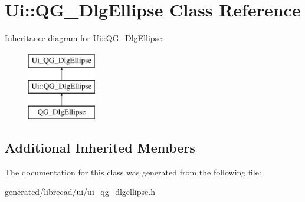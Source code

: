 \hypertarget{classUi_1_1QG__DlgEllipse}{\section{Ui\-:\-:Q\-G\-\_\-\-Dlg\-Ellipse Class Reference}
\label{classUi_1_1QG__DlgEllipse}
}
Inheritance diagram for Ui\-:\-:Q\-G\-\_\-\-Dlg\-Ellipse\-:\begin{figure}[H]
\begin{center}
\leavevmode
\includegraphics[height=3.000000cm]{classUi_1_1QG__DlgEllipse}
\end{center}
\end{figure}
\subsection*{Additional Inherited Members}


The documentation for this class was generated from the following file\-:\begin{DoxyCompactItemize}
\item 
generated/librecad/ui/ui\-\_\-qg\-\_\-dlgellipse.\-h\end{DoxyCompactItemize}
